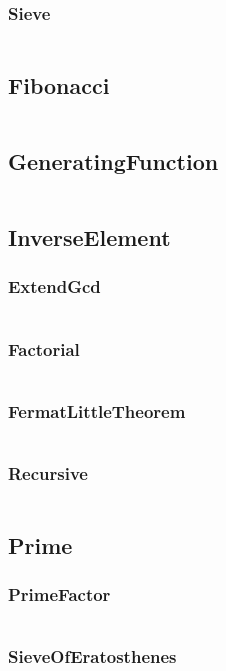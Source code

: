 \documentclass[a4paper,11pt]{article}
\begin{document}
\subsubsection{Sieve}
\inputminted[breaklines]{c++}{02++Math/+Euler/+Sieve.cpp}

\subsection{Fibonacci}
\inputminted[breaklines]{c++}{02++Math/+Fibonacci.cpp}
\subsection{GeneratingFunction}
\inputminted[breaklines]{c++}{02++Math/+GeneratingFunction.cpp}
\subsection{InverseElement}
\subsubsection{ExtendGcd}
\inputminted[breaklines]{c++}{02++Math/+InverseElement/+ExtendGcd.cpp}
\subsubsection{Factorial}
\inputminted[breaklines]{c++}{02++Math/+InverseElement/+Factorial.cpp}
\subsubsection{FermatLittleTheorem}
\inputminted[breaklines]{c++}{02++Math/+InverseElement/+FermatLittleTheorem.cpp}
\subsubsection{Recursive}
\inputminted[breaklines]{c++}{02++Math/+InverseElement/+Recursive.cpp}

\subsection{Prime}
\subsubsection{PrimeFactor}
\inputminted[breaklines]{c++}{02++Math/+Prime/+PrimeFactor.cpp}
\subsubsection{SieveOfEratosthenes}
\inputminted[breaklines]{c++}{02++Math/+Prime/+SieveOfEratosthenes.cpp}
\end{document}
